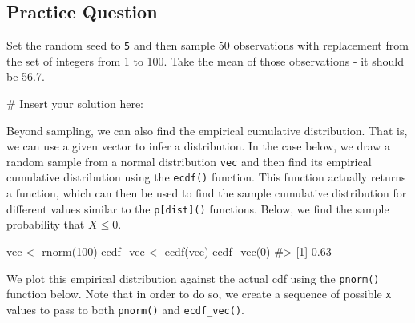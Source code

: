 \documentclass[
  letterpaper,
]{krantz}
\makeatletter
\newenvironment{Shaded}{\begin{snugshade}}{\end{snugshade}}
\newcommand{\CommentTok}[1]{\textcolor[rgb]{0.37,0.37,0.37}{#1}}
\newcommand{\DecValTok}[1]{\textcolor[rgb]{0.68,0.00,0.00}{#1}}
\newcommand{\FunctionTok}[1]{\textcolor[rgb]{0.28,0.35,0.67}{#1}}
\newcommand{\NormalTok}[1]{\textcolor[rgb]{0.00,0.23,0.31}{#1}}
\newcommand{\OtherTok}[1]{\textcolor[rgb]{0.00,0.23,0.31}{#1}}
\newenvironment{kframe}{%
\medskip{}
\setlength{\fboxsep}{.8em}
 \def\at@end@of@kframe{}%
 \ifinner\ifhmode%
  \def\at@end@of@kframe{\end{minipage}}%
  \begin{minipage}{\columnwidth}%
 \fi\fi%
 \def\FrameCommand##1{\hskip\@totalleftmargin \hskip-\fboxsep
 \colorbox{shadecolor}{##1}\hskip-\fboxsep
     \hskip-\linewidth \hskip-\@totalleftmargin \hskip\columnwidth}%
 \MakeFramed {\advance\hsize-\width
   \@totalleftmargin\z@ \linewidth\hsize
   \@setminipage}}%
 {\par\unskip\endMakeFramed%
 \at@end@of@kframe}
\renewenvironment{Shaded}{\begin{kframe}}{\end{kframe}}
\makeatother
\begin{document}
\hypertarget{practice-question-16}{%
\subsection{Practice Question}\label{practice-question-16}}

Set the random seed to \texttt{5} and then sample 50 observations with
replacement from the set of integers from 1 to 100. Take the mean of
those observations - it should be 56.7.

\begin{Shaded}
\begin{Highlighting}[]
\CommentTok{\# Insert your solution here:}
\end{Highlighting}
\end{Shaded}

Beyond sampling, we can also find the empirical cumulative distribution.
That is, we can use a given vector to infer a distribution. In the case
below, we draw a random sample from a normal distribution \texttt{vec}
and then find its empirical cumulative distribution using the
\texttt{ecdf()} function. This function actually returns a function,
which can then be used to find the sample cumulative distribution for
different values similar to the \texttt{p{[}dist{]}()} functions. Below,
we find the sample probability that \(X \leq 0\).

\begin{Shaded}
\begin{Highlighting}[]
\NormalTok{vec }\OtherTok{\textless{}{-}} \FunctionTok{rnorm}\NormalTok{(}\DecValTok{100}\NormalTok{) }
\NormalTok{ecdf\_vec }\OtherTok{\textless{}{-}} \FunctionTok{ecdf}\NormalTok{(vec)}
\FunctionTok{ecdf\_vec}\NormalTok{(}\DecValTok{0}\NormalTok{)}
\CommentTok{\#\textgreater{} [1] 0.63}
\end{Highlighting}
\end{Shaded}

We plot this empirical distribution against the actual cdf using the
\texttt{pnorm()} function below. Note that in order to do so, we create
a sequence of possible \texttt{x} values to pass to both
\texttt{pnorm()} and \texttt{ecdf\_vec()}.
\end{document}
